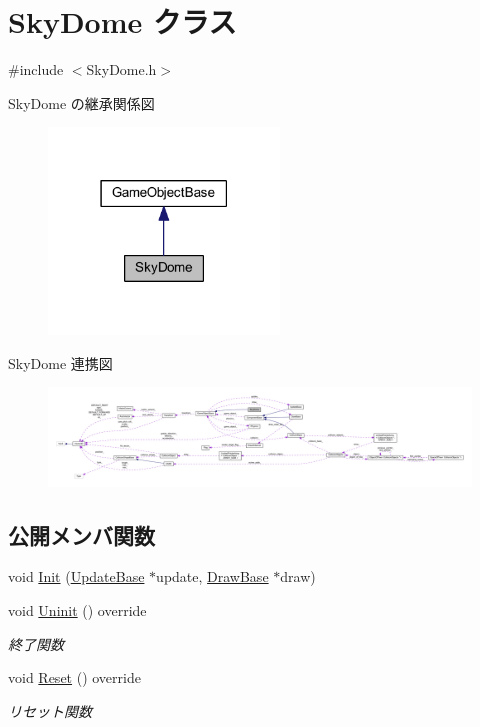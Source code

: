 \hypertarget{class_sky_dome}{}\section{Sky\+Dome クラス}
\label{class_sky_dome}


{\ttfamily \#include $<$Sky\+Dome.\+h$>$}



Sky\+Dome の継承関係図\nopagebreak
\begin{figure}[H]
\begin{center}
\leavevmode
\includegraphics[width=174pt]{class_sky_dome__inherit__graph}
\end{center}
\end{figure}


Sky\+Dome 連携図\nopagebreak
\begin{figure}[H]
\begin{center}
\leavevmode
\includegraphics[width=350pt]{class_sky_dome__coll__graph}
\end{center}
\end{figure}
\subsection*{公開メンバ関数}
\begin{DoxyCompactItemize}
\item 
void \mbox{\hyperlink{class_sky_dome_a948e0e90cea46c78053ac55610812d6c}{Init}} (\mbox{\hyperlink{class_update_base}{Update\+Base}} $\ast$update, \mbox{\hyperlink{class_draw_base}{Draw\+Base}} $\ast$draw)
\item 
void \mbox{\hyperlink{class_sky_dome_a7fc71bfa671cf6e7ab26a194459b0753}{Uninit}} () override
\begin{DoxyCompactList}\small\item\em 終了関数 \end{DoxyCompactList}\item 
void \mbox{\hyperlink{class_sky_dome_abc6f8ed1471d7b03f25924a849cae590}{Reset}} () override
\begin{DoxyCompactList}\small\item\em リセット関数 \end{DoxyCompactList}\end{DoxyCompactItemize}
